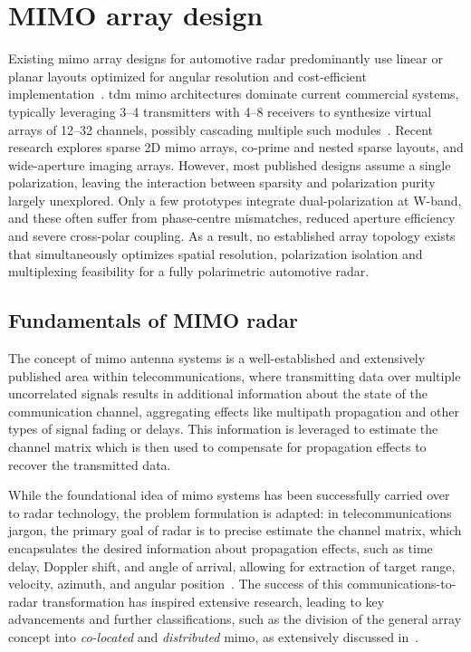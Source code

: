 \section{MIMO array design}
\label{sec:mimo-topologies}

Existing \gls{mimo} array designs for automotive radar predominantly use linear or planar layouts optimized for angular resolution and cost-efficient implementation~\parencite{texasInstrumentsAwr2994EvaluationModule2024}.
\Gls{tdm} \gls{mimo} architectures dominate current commercial systems, typically leveraging 3--4 transmitters with 4--8 receivers to synthesize virtual arrays of 12--32 channels, possibly cascading multiple such modules~\parencite{texasInstrumentsAwrxCascadedRadar2020}.
Recent research explores sparse 2D \gls{mimo} arrays, co-prime and nested sparse layouts, and wide-aperture imaging arrays.
However, most published designs assume a single polarization, leaving the interaction between sparsity and polarization purity largely unexplored.
Only a few prototypes integrate dual-polarization at W-band, and these often suffer from phase-centre mismatches, reduced aperture efficiency and severe cross-polar coupling.
As a result, no established array topology exists that simultaneously optimizes spatial resolution, polarization isolation and multiplexing feasibility for a fully polarimetric automotive radar.


\subsection{Fundamentals of MIMO radar}

The concept of \gls{mimo} antenna systems is a well-established and extensively published area within telecommunications, where transmitting data over multiple uncorrelated signals results in additional information about the state of the communication channel, aggregating effects like multipath propagation and other types of signal fading or delays.
This information is leveraged to estimate the channel matrix which is then used to compensate for propagation effects to recover the transmitted data.

While the foundational idea of \gls{mimo} systems has been successfully carried over to radar technology, the problem formulation is adapted: in telecommunications jargon, the primary goal of radar is to precise estimate the channel matrix, which encapsulates the desired information about propagation effects, such as time delay, Doppler shift, and angle of arrival, allowing for extraction of target range, velocity, azimuth, and angular position~\parencite{blissMultipleinputMultipleoutputMIMO2003,forsytheMultipleinputMultipleoutputMIMO2004}.
The success of this communications-to-radar transformation has inspired extensive research, leading to key advancements and further classifications, such as the division of the general array concept into \emph{co-located} and \emph{distributed} \gls{mimo}, as extensively discussed in~\parencite{fishlerMIMORadarIdea2004,fishlerSpatialDiversityRadars2006}.

